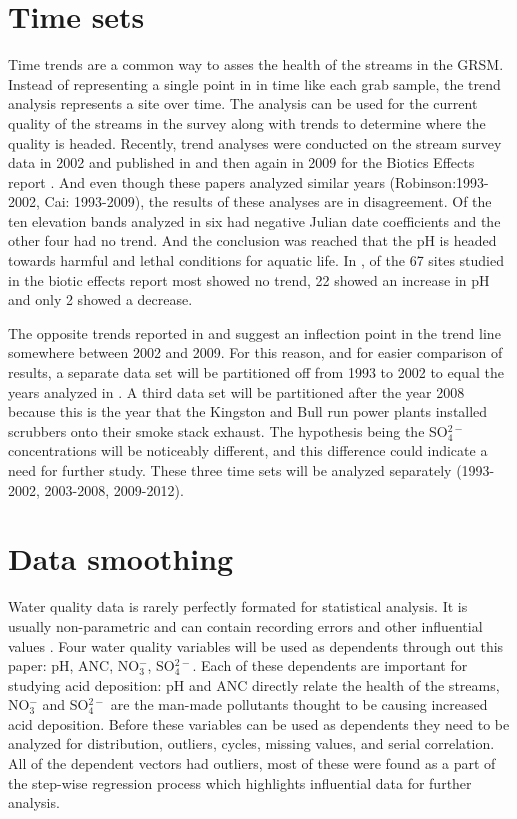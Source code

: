 \section{Time sets}

Time trends are a common way to asses the health of the streams in the GRSM.
Instead of representing a single point in in time like each grab sample, the trend analysis represents a site over time.
The analysis can be used for the current quality of the streams in the survey along with trends to determine where the quality is headed. 
Recently, trend analyses were conducted on the stream survey data in 2002 and published in \citet{robinson2008ph} and then again in 2009 for the Biotics Effects report \citep{cai2013}.
And even though these papers analyzed similar years (Robinson:1993-2002, Cai: 1993-2009), the results of these analyses are in disagreement.
Of the ten elevation bands analyzed in \citet{robinson2008ph} six had negative Julian date coefficients and the other four had no trend.
And the conclusion was reached that the pH is headed towards harmful and lethal conditions for aquatic life. 
In \citet{cai2013}, of the 67 sites studied in the biotic effects report most showed no trend, 22 showed an increase in pH and only 2 showed a decrease. 

The opposite trends reported in  \citet{robinson2008ph} and \citet{cai2013} suggest an inflection point in the trend line somewhere between 2002 and 2009. 
For this reason, and for easier comparison of results,  a separate data set will be partitioned off from 1993 to 2002 to equal the years analyzed in \citet{robinson2008ph}.  
A third data set will be partitioned after the year 2008 because this is the year that the Kingston and Bull run power plants installed scrubbers onto their smoke stack exhaust. 
The hypothesis being the SO$_4^{2-}$ concentrations will be noticeably different, and this difference could indicate a need for further study. 
These three time sets will be analyzed separately (1993-2002, 2003-2008, 2009-2012).

\section{Data smoothing}  \label{sec:smoothing}%

Water quality data is rarely perfectly formated for statistical analysis.
It is usually  non-parametric and can contain recording errors and other influential values \citep{helsel1992statistical}.
Four water quality variables will be used as dependents through out this paper: pH, ANC, NO$_3^-$, SO$_4^{2-}$.
Each of these dependents are important for studying acid deposition: pH and ANC directly relate the health of the streams, NO$_3^-$ and SO$_4^{2-}$ are the man-made pollutants thought to be causing increased acid deposition.
Before these variables can be used as dependents they need to be analyzed for distribution, outliers, cycles, missing values, and serial correlation\citep{helsel1992statistical}.
All of the dependent vectors had outliers, most of these were found as a part of the step-wise regression process which highlights influential data for further analysis.

